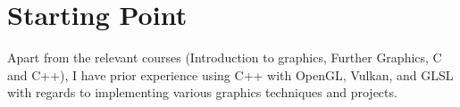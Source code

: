 \section*{Starting Point}

Apart from the relevant courses (Introduction to graphics, Further
Graphics, C and C++), I have prior experience using C++ with OpenGL,
Vulkan, and GLSL with regards to implementing various graphics
techniques and projects.

